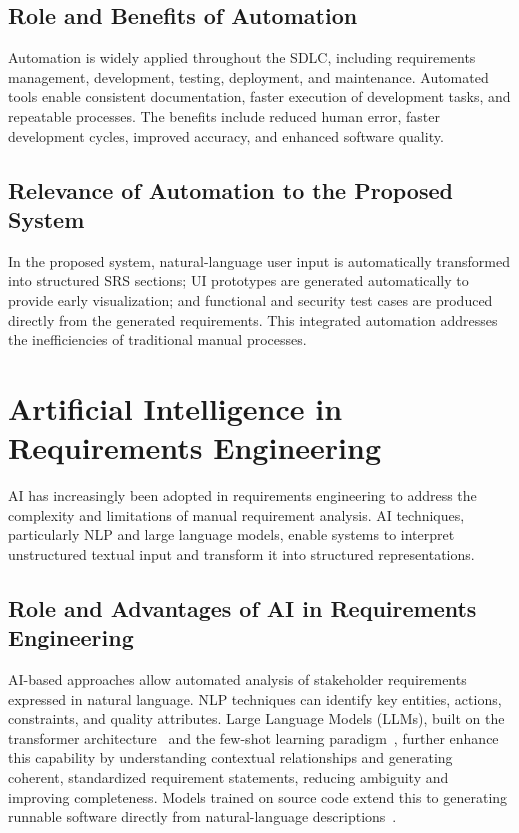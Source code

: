 \documentclass[12pt,a4paper,oneside]{report}
\begin{document}
\subsection{Role and Benefits of Automation}
Automation is widely applied throughout the SDLC, including requirements management, development, testing, deployment, and maintenance. Automated tools enable consistent documentation, faster execution of development tasks, and repeatable processes. The benefits include reduced human error, faster development cycles, improved accuracy, and enhanced software quality.

\subsection{Relevance of Automation to the Proposed System}
In the proposed system, natural-language user input is automatically transformed into structured SRS sections; UI prototypes are generated automatically to provide early visualization; and functional and security test cases are produced directly from the generated requirements. This integrated automation addresses the inefficiencies of traditional manual processes.

\section{Artificial Intelligence in Requirements Engineering}
AI has increasingly been adopted in requirements engineering to address the complexity and limitations of manual requirement analysis. AI techniques, particularly NLP and large language models, enable systems to interpret unstructured textual input and transform it into structured representations.

\subsection{Role and Advantages of AI in Requirements Engineering}
AI-based approaches allow automated analysis of stakeholder requirements expressed in natural language. NLP techniques can identify key entities, actions, constraints, and quality attributes. Large Language Models (LLMs), built on the transformer architecture~\cite{ref13} and the few-shot learning paradigm~\cite{ref14}, further enhance this capability by understanding contextual relationships and generating coherent, standardized requirement statements, reducing ambiguity and improving completeness. Models trained on source code extend this to generating runnable software directly from natural-language descriptions~\cite{ref15,ref3}.
\end{document}
